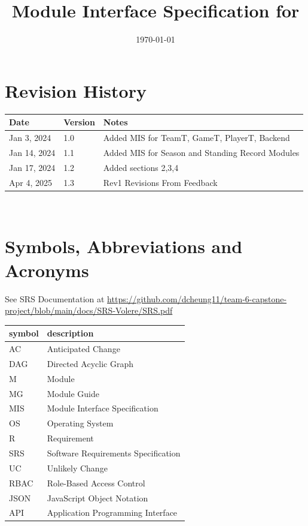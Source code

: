 \documentclass[12pt, titlepage]{article}
\begin{document}
\title{Module Interface Specification for \progname{}}

\author{\authname}

\date{\today}

\maketitle


\section{Revision History}

\begin{tabularx}{\textwidth}{p{3cm}p{2cm}X}
  \toprule {\bf Date} & {\bf Version} & {\bf Notes}                                  \\
  \midrule
  Jan 3, 2024               & 1.0           & Added MIS for TeamT, GameT, PlayerT, Backend \\
  Jan 14, 2024              & 1.1          & Added MIS for Season and Standing Record Modules           \\
  Jan 17, 2024              & 1.2          & Added sections 2,3,4                                        \\
  Apr 4, 2025               & 1.3          & Rev1 Revisions From Feedback                                       \\
  \bottomrule
\end{tabularx}

~\newpage

\section{Symbols, Abbreviations and Acronyms}

See SRS Documentation at \url{https://github.com/dcheung11/team-6-capstone-project/blob/main/docs/SRS-Volere/SRS.pdf}

\renewcommand{\arraystretch}{1.2}
\begin{tabular}{l l} 
  \toprule		
  \textbf{symbol} & \textbf{description}\\
  \midrule 
  AC & Anticipated Change\\
  DAG & Directed Acyclic Graph \\
  M & Module \\
  MG & Module Guide \\
  MIS & Module Interface Specification\\
  OS & Operating System \\
  R & Requirement\\
  SRS & Software Requirements Specification\\
  UC & Unlikely Change \\
  RBAC & Role-Based Access Control \\
  JSON & JavaScript Object Notation \\
  API & Application Programming Interface \\
  \bottomrule
\end{tabular}\\
\end{document}

